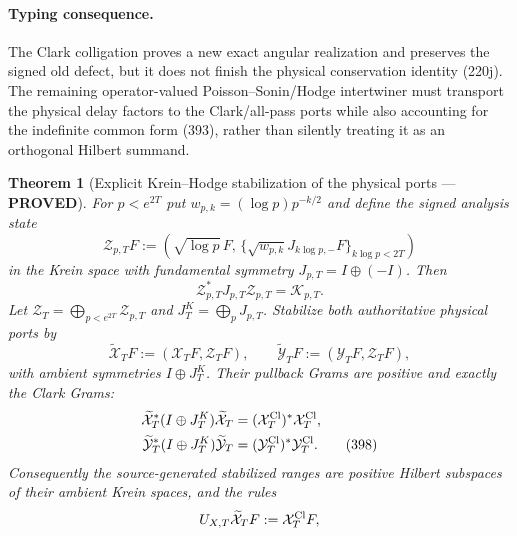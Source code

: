 \documentclass[11pt]{article}
\newtheorem{theorem}{Theorem}
\newcommand{\PROVED}{\textcolor{green!45!black}{\textbf{PROVED}}}
\begin{document}
\paragraph{Typing consequence.}
The Clark colligation proves a new exact angular realization and preserves
the signed old defect, but it does not finish the physical conservation
identity (220j).  The remaining operator-valued Poisson--Sonin/Hodge
intertwiner must transport the physical delay factors to the Clark/all-pass
ports while also accounting for the indefinite common form (393), rather
than silently treating it as an orthogonal Hilbert summand.

\begin{theorem}[Explicit Krein--Hodge stabilization of the physical ports ---
\PROVED]
For $p<e^{2T}$ put $w_{p,k}=(\log p)p^{-k/2}$ and define the signed analysis
state
\begin{equation}
 \mathcal Z_{p,T}F:=
 \left(
   \sqrt{\log p}\,F,\,
   \{\sqrt{w_{p,k}}J_{k\log p,-}F\}_{k\log p<2T}
 \right)                                             \tag{395}
\end{equation}
in the Krein space with fundamental symmetry
$J_{p,T}=I\oplus(-I)$.  Then
\begin{equation}
 \boxed{\mathcal Z_{p,T}^*J_{p,T}\mathcal Z_{p,T}
       =\mathcal K_{p,T}.}                           \tag{396}
\end{equation}
Let $\mathcal Z_T=\bigoplus_{p<e^{2T}}\mathcal Z_{p,T}$ and
$J_T^K=\bigoplus_pJ_{p,T}$.  Stabilize both authoritative physical ports by
\begin{equation}
 \widetilde{\mathcal X}_TF:=
      (\mathcal X_TF,\mathcal Z_TF),\qquad
 \widetilde{\mathcal Y}_TF:=
      (\mathcal Y_TF,\mathcal Z_TF),                 \tag{397}
\end{equation}
with ambient symmetries $I\oplus J_T^K$.  Their pullback Grams are positive
and exactly the Clark Grams:
\begin{align}
 \widetilde{\mathcal X}_T^*(I\oplus J_T^K)
       \widetilde{\mathcal X}_T
 &=(\mathcal X_T^{\rm Cl})^*\mathcal X_T^{\rm Cl},\notag\\
 \widetilde{\mathcal Y}_T^*(I\oplus J_T^K)
       \widetilde{\mathcal Y}_T
 &=(\mathcal Y_T^{\rm Cl})^*\mathcal Y_T^{\rm Cl}.   \tag{398}
\end{align}
Consequently the source-generated stabilized ranges are positive Hilbert
subspaces of their ambient Krein spaces, and the rules
\begin{align}
 U_{X,T}\widetilde{\mathcal X}_TF&:=\mathcal X_T^{\rm Cl}F,\notag\\

\end{align}
\end{theorem}
\end{document}
